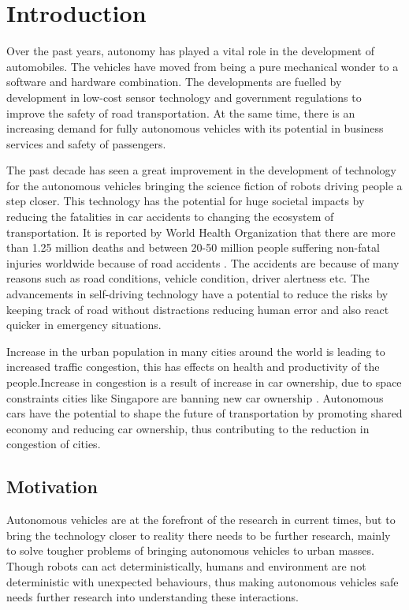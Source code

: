 \chapter{Introduction}
\label{introduction}

Over the past years, autonomy has played a vital role in the development of automobiles. The vehicles have moved from being a pure mechanical wonder to a software and hardware combination. The developments are fuelled by development in low-cost sensor technology and government regulations to improve the safety of road transportation. At the same time, there is an increasing demand for fully autonomous vehicles with its potential in business services and safety of passengers.

The past decade has seen a great improvement in the development of technology for the autonomous vehicles bringing the science fiction of robots driving people a step closer. This technology has the potential for huge societal impacts by reducing the fatalities in car accidents to changing the ecosystem of transportation. It is reported by World Health Organization that there are more than 1.25 million deaths and between 20-50 million people suffering non-fatal injuries worldwide because of road accidents \cite{whoaccidents}. The accidents are because of many reasons such as road conditions, vehicle condition, driver alertness etc. The advancements in self-driving technology have a potential to reduce the risks by keeping track of road without distractions reducing human error and also react quicker in emergency situations.

Increase in the urban population in many cities around the world is leading to increased traffic congestion, this has effects on health and productivity of the people\cite{citycongestion}.Increase in congestion is a result of increase in car ownership, due to space constraints cities like Singapore are banning new car ownership \cite{singaporebanscars}. Autonomous cars have the potential to shape the future of transportation by promoting shared economy and reducing car ownership, thus contributing to the reduction in congestion of cities. 


\section{Motivation}

Autonomous vehicles are at the forefront of the research in current times, but to bring the technology closer to reality there needs to be further research, mainly to solve tougher problems of bringing autonomous vehicles to urban masses. Though robots can act deterministically, humans and environment are not deterministic with unexpected behaviours, thus making autonomous vehicles safe needs further research into understanding these interactions.

